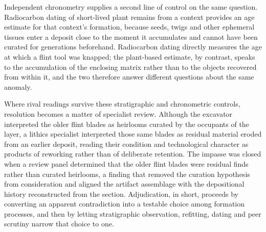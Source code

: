 \documentclass[11pt]{article}
\begin{document}
{Independent chronometry supplies a second line of control on the same question. Radiocarbon dating of short-lived plant remains from a context provides an age estimate for that context's formation, because seeds, twigs and other ephemeral tissues enter a deposit close to the moment it accumulates and cannot have been curated for generations beforehand. Radiocarbon dating directly measures the age at which a flint tool was knapped; the plant-based estimate, by contrast, speaks to the accumulation of the enclosing matrix rather than to the objects recovered from within it, and the two therefore answer different questions about the same anomaly.

Where rival readings survive these stratigraphic and chronometric controls, resolution becomes a matter of specialist review. Although the excavator interpreted the older flint blades as heirlooms curated by the occupants of the layer, a lithics specialist interpreted those same blades as residual material eroded from an earlier deposit, reading their condition and technological character as products of reworking rather than of deliberate retention. The impasse was closed when a review panel determined that the older flint blades were residual finds rather than curated heirlooms, a finding that removed the curation hypothesis from consideration and aligned the artifact assemblage with the depositional history reconstructed from the section. Adjudication, in short, proceeds by converting an apparent contradiction into a testable choice among formation processes, and then by letting stratigraphic observation, refitting, dating and peer scrutiny narrow that choice to one.}
\end{document}
